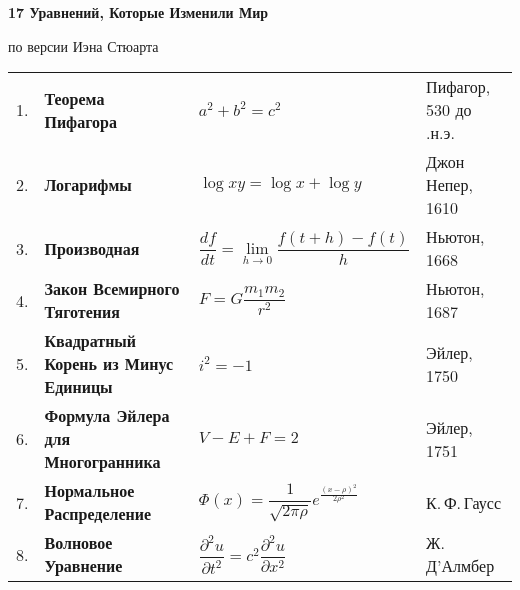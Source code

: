 \documentclass{article}
\def\ddd#1#2{\dfrac{\partial^2#1}{\partial#2}}
\begin{document}
    \hspace{10mm} {\LARGE \bf{17 Уравнений, Которые Изменили Мир}}

    \hspace{40mm} {\LARGE по версии Иэна Стюарта}

    \vspace{10mm}
    \begin{tabular}{l l l l}

        \vspace{5mm}
            1. & 
            \textbf{Теорема Пифагора} & 
            $a^2+b^2=c^2$ & 
            Пифагор, 530 до .н.э. \\
    
        \vspace{5mm}
            2. & 
            \textbf{Логарифмы} & 
            $\log{xy}=\log{x}+\log{y}$ & 
            Джон Непер, 1610 \\
    
        \vspace{5mm}
            3. & 
            \textbf{Производная} & 
            $\dfrac {df}{dt} = \lim\limits_{h \to 0} \dfrac{f(t+h)-f(t)}{h}$ & 
            Ньютон, 1668  \\
    
        \vspace{5mm}
            4. &
            \textbf{Закон Всемирного Тяготения} & 
            $F=G \dfrac {m_1m_2}{r^2}$ & 
            Ньютон, 1687\\
    
        \vspace{5mm}
            5. &
            \textbf{Квадратный Корень из Минус Единицы} &
            $i^2=-1$ & Эйлер, 1750\\
    
        \vspace{5mm}
            6. & 
            \textbf{Формула Эйлера для Многогранника} & 
            $V-E+F=2$ & 
            Эйлер, 1751 \\
    
        \vspace{5mm}
            7. & 
            \textbf{Нормальное Распределение} 
            & $\Phi(x) = \dfrac{1}{\sqrt{2\pi\rho}} e^{\frac{(x-\rho)^2}{2\rho^2}}$ & 
            К.\,Ф.\,Гаусс \\
        
        \vspace{5mm}
            8. & 
            \textbf{Волновое Уравнение} & 
            $\ddd{u}{t^2}=c^2\ddd{u}{x^2}$ & 
            Ж.\,Д'Алмбер \\
    

\end{tabular}
\end{document}
